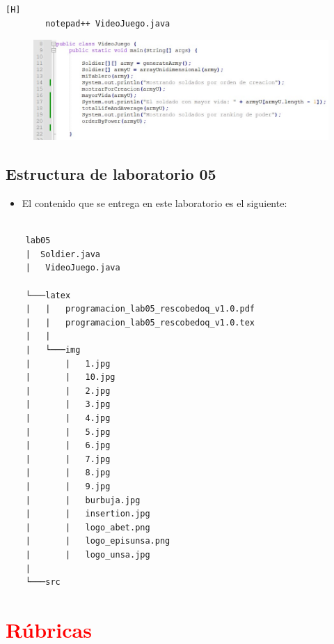 \documentclass{article}
\begin{document}
	
	\begin{lstlisting}[language=bash,caption={ Estructura del main }][H]
		notepad++ VideoJuego.java	
	\end{lstlisting}
	\begin{figure}[H]
		\centering
		\includegraphics[width=1.1\textwidth,keepaspectratio]{img/10.jpg}
	\end{figure}
	
	
	\subsection{Estructura de laboratorio 05}
	\begin{itemize}	
		\item El contenido que se entrega en este laboratorio es el siguiente:
	\end{itemize}
	
	\begin{lstlisting}[style=ascii-tree]
		
	lab05	
	|  Soldier.java
	|   VideoJuego.java
	
	└───latex
	|   |   programacion_lab05_rescobedoq_v1.0.pdf
	|   |   programacion_lab05_rescobedoq_v1.0.tex
	|   |
	|   └───img
	|       |   1.jpg
	|       |   10.jpg
	|       |   2.jpg
	|       |   3.jpg
	|       |   4.jpg
	|       |   5.jpg
	|       |   6.jpg
	|       |   7.jpg
	|       |   8.jpg
	|       |   9.jpg
	|       |   burbuja.jpg
	|       |   insertion.jpg
	|       |   logo_abet.png
	|       |   logo_episunsa.png
	|       |   logo_unsa.jpg            
	|
	└───src

	\end{lstlisting}    
	
	\section{\textcolor{red}{Rúbricas}}
	
\end{document}
